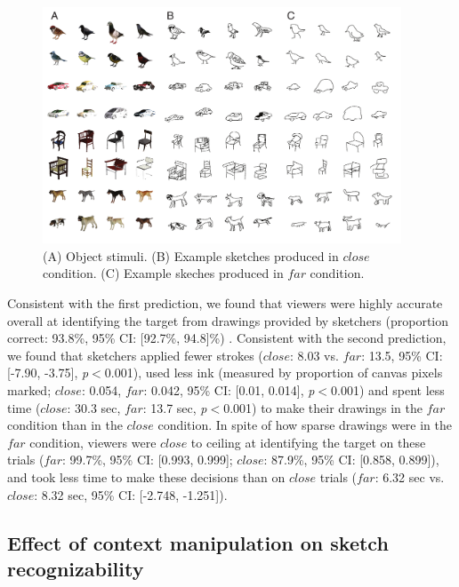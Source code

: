 \documentclass[9pt,twocolumn,twoside]{pnas-new}
\newcommand{\mwu}[1]{{\color{green}{[mwu: #1]}}}
\begin{document}
\begin{figure}[htbp]
\centering
\includegraphics[width=0.95\textwidth]{figures/2_sketch_gallery.pdf}
\caption{(A) Object stimuli. (B) Example sketches produced in $close$ condition. (C) Example skeches produced in $far$ condition.}
\label{sketch_gallery}
\end{figure}

Consistent with the first prediction, we found that viewers were highly accurate overall at identifying the target from drawings provided by sketchers (proportion correct: 93.8\%, 95\% CI: [92.7\%, 94.8]\%) \mwu{(by bootstrap) reminder to explain CI procedure, maybe in supplement.}. Consistent with the second prediction, we found that sketchers applied fewer strokes ($close$: 8.03 vs. $far$: 13.5, 95\% CI: [-7.90, -3.75], \textit{p}$<$0.001), \mwu{mention that this is CI of the difference} used less ink (measured by proportion of canvas pixels marked; $close$: 0.054, $far$: 0.042, 95\% CI: [0.01, 0.014], \textit{p}$<$0.001) and spent less time ($close$: 30.3 sec, $far$: 13.7 sec, \textit{p}$<$0.001) to make their drawings in the $far$ condition than in the $close$ condition. In spite of how sparse drawings were in the $far$ condition, viewers were $close$ \mwu{dont use this word here -- use ``near"} to ceiling at identifying the target on these trials ($far$: 99.7\%, 95\% CI: [0.993, 0.999]; $close$: 87.9\%, 95\% CI: [0.858, 0.899]), and took less time to make these decisions than on $close$ trials ($far$: 6.32 sec vs. $close$: 8.32 sec, 95\% CI: [-2.748, -1.251]).

\subsection*{Effect of context manipulation on sketch recognizability}
\end{document}
